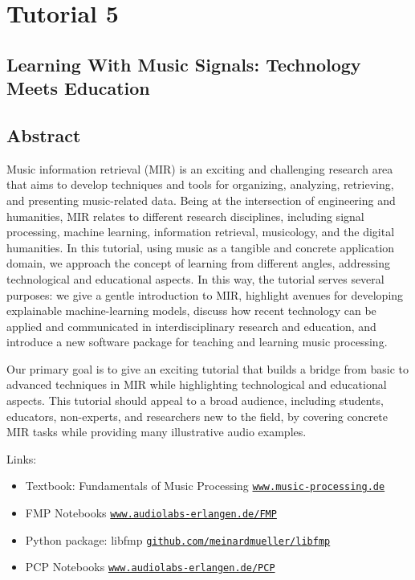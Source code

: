 \clearpage


\section*{Tutorial 5}
{}
%
\subsection*{Learning With Music Signals: Technology Meets Education}

\subsection*{Abstract}
Music information retrieval (MIR) is an exciting and challenging research area that aims to develop techniques and tools for organizing, analyzing, retrieving, and presenting music-related data. Being at the intersection of engineering and humanities, MIR relates to different research disciplines, including signal processing, machine learning, information retrieval, musicology, and the digital humanities. In this tutorial, using music as a tangible and concrete application domain, we approach the concept of learning from different angles, addressing technological and educational aspects. In this way, the tutorial serves several purposes: we give a gentle introduction to MIR, highlight avenues for developing explainable machine-learning models, discuss how recent technology can be applied and communicated in interdisciplinary research and education, and introduce a new software package for teaching and learning music processing.

Our primary goal is to give an exciting tutorial that builds a bridge from basic to advanced techniques in MIR while highlighting technological and educational aspects. This tutorial should appeal to a broad audience, including students, educators, non-experts, and researchers new to the field, by covering concrete MIR tasks while providing many illustrative audio examples.

Links:
\begin{itemize}
\item Textbook: Fundamentals of Music Processing \href{https://www.music-processing.de/}{\nolinkurl{www.music-processing.de}}
\item FMP Notebooks \href{https://www.audiolabs-erlangen.de/FMP/}{\nolinkurl{www.audiolabs-erlangen.de/FMP}}
\item Python package: libfmp \href{https://github.com/meinardmueller/libfmp/}{\nolinkurl{github.com/meinardmueller/libfmp}}
\item PCP Notebooks \href{https://www.audiolabs-erlangen.de/PCP/}{\nolinkurl{www.audiolabs-erlangen.de/PCP}}
\end{itemize}


